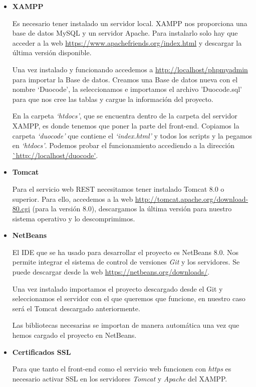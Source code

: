 \begin{itemize}
\item \textbf{XAMPP}

Es necesario tener instalado un servidor local. XAMPP nos proporciona una base de datos MySQL y un servidor Apache.
Para instalarlo solo hay que acceder a la web \url{https://www.apachefriends.org/index.html} y descargar la última versión disponible.


Una vez instalado y funcionando accedemos a \url{http://localhost/phpmyadmin} para importar la Base de datos.
Creamos una Base de datos nueva con el nombre `Duocode', la seleccionamos e importamos el archivo 'Duocode.sql' para que nos cree las tablas y cargue la información del proyecto.


En la carpeta \textit{`htdocs'}, que se encuentra dentro de la carpeta del servidor XAMPP, es donde tenemos que poner la parte del front-end.
Copiamos la carpeta \textit{`duocode'} que contiene el \textit{`index.html'} y todos los scripts y la pegamos en \textit{`htdocs'}.
Podemos probar el funcionamiento accediendo a la dirección \url{`http://localhost/duocode'}.



\item \textbf{Tomcat}

Para el servicio web REST necesitamos tener instalado Tomcat 8.0 o superior. Para ello, accedemos a la web \url{http://tomcat.apache.org/download-80.cgi} (para la versión 8.0), descargamos la última versión para nuestro sistema operativo y lo descomprimimos.



\item \textbf{NetBeans}

El IDE que se ha usado para desarrollar el proyecto es NetBeans 8.0. Nos permite integrar el sistema de control de versiones \textit{Git} y los servidores. Se puede descargar desde la web \url{https://netbeans.org/downloads/}.

Una vez instalado importamos el proyecto descargado desde el Git y seleccionamos el servidor con el que queremos que funcione, en nuestro caso será el Tomcat descargado anteriormente.

Las bibliotecas necesarias se importan de manera automática una vez que hemos cargado el proyecto en NetBeans.

\item \textbf{Certificados SSL}

Para que tanto el front-end como el servicio web funcionen con \textit{https} es necesario activar SSL en los servidores \textit{Tomcat} y \textit{Apache} del XAMPP.


\end{itemize}
